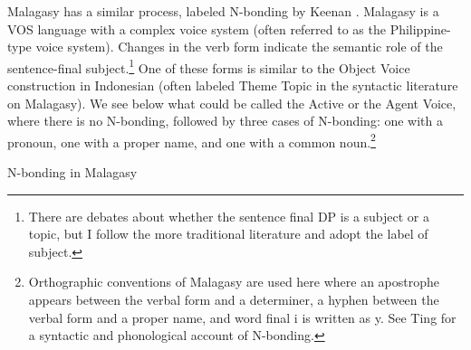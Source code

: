 \documentclass[output=paper,colorlinks,citecolor=brown,
]{langscibook}
\begin{document}


Malagasy has a similar process, labeled  N-bonding by Keenan \citeyearpar{Keenan:2000}.  Malagasy is a VOS language with a complex voice system (often referred to as the Philippine-type voice system).  Changes in the verb form indicate the semantic role of the sentence-final subject.\footnote{There are debates about whether the sentence final DP is a subject or a topic, but I follow the more traditional literature and adopt the label of subject.}  One of these forms is similar to the Object Voice construction in Indonesian (often labeled Theme Topic in the syntactic literature on Malagasy).  We see below what could be called the Active or the Agent Voice, where there is no N-bonding, followed by three cases of N-bonding: one with a pronoun, one with a proper name, and one with a common noun.\footnote{Orthographic conventions of Malagasy are used here where an apostrophe appears between the verbal form and a determiner, a hyphen between the verbal form and a proper name, and word final i is written as y. See Ting \citeyearpar{Ting:2021} for a syntactic and phonological account of N-bonding.}

\ea N-bonding in Malagasy
\end{document}
